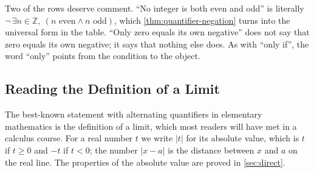 \begin{table}
\end{table}

Two of the rows deserve comment. ``No integer is both even and odd'' is literally $\neg\,\exists n\in\mathbb Z,\ (n\text{ even}\wedge n\text{ odd})$, which \cref{thm:quantifier-negation} turns into the universal form in the table. ``Only zero equals its own negative'' does not say that zero equals its own negative; it says that nothing else does. As with ``only if'', the word ``only'' points from the condition to the object.

\subsection{Reading the Definition of a Limit}

The best-known statement with alternating quantifiers in elementary mathematics is the definition of a limit, which most readers will have met in a calculus course. For a real number $t$ we write $|t|$ for its absolute value, which is $t$ if $t\ge 0$ and $-t$ if $t<0$; the number $|x-a|$ is the distance between $x$ and $a$ on the real line. The properties of the absolute value are proved in \cref{sec:direct}.

